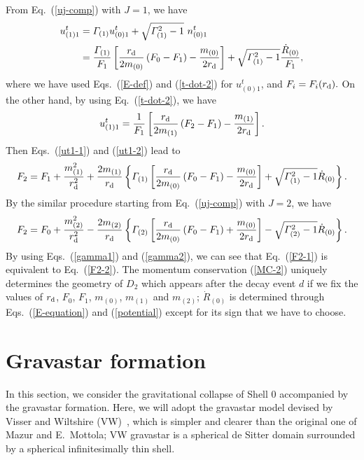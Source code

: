 \documentclass[aps,preprint,preprintnumber,nofootinbib,amsmath,amssymb,ascmac,bm,12pt]{revtex4}
\newcommand{\rd}{r_{\rm d}}
\newcommand{\mz}{m_{(0)}}
\newcommand{\mo}{m_{(1)}}
\newcommand{\mt}{m_{(2)}}
\newcommand{\Go}{\varGamma_{(1)}}
\newcommand{\Gt}{\varGamma_{(2)}}
\begin{document}
From Eq.~(\ref{uj-comp}) with $J=1$, we have
\begin{align}
u_{(1)1}^t&=\Go u_{(0)1}^t+\sqrt{\Go^2-1}~n_{(0)1}^t \nonumber \\
&=\frac{\Go}{F_1}\left[\frac{\rd}{2\mz}\left(F_0-F_1\right)-\frac{\mz}{2\rd}\right]+\sqrt{\Go^2-1}\frac{\dot{R}_{(0)}}{F_1}, 
\label{ut1-1}
\end{align}
where we have used Eqs.~(\ref{E-def}) and (\ref{t-dot-2}) for $u_{(0)1}^t$, and
$
F_i=F_i(\rd).
$
On the other hand, by using Eq.~(\ref{t-dot-2}), we have
\begin{equation}
u_{(1)1}^t=\frac{1}{F_1}\left[\frac{\rd}{2\mo}\left(F_2-F_1\right)-\frac{\mo}{2\rd}\right]. \label{ut1-2}
\end{equation}
Then Eqs.~(\ref{ut1-1}) and (\ref{ut1-2}) lead to
\begin{equation}
F_2=F_1+\frac{\mo^2}{\rd^2}+\frac{2\mo}{\rd}
\left\{\Go\left[\frac{\rd}{2\mz}\left(F_0-F_1\right)-\frac{\mz}{2\rd}\right]+\sqrt{\Go^2-1} \dot{R}_{(0)}\right\}. \label{F2-1}
\end{equation}
By the similar procedure starting from Eq.~(\ref{uj-comp}) with $J=2$, we have
\begin{equation}
F_2=F_0+\frac{\mt^2}{\rd^2}-\frac{2\mt}{\rd}
\left\{\Gt\left[\frac{\rd}{2\mz}\left(F_0-F_1\right)+\frac{\mz}{2\rd}\right]-\sqrt{\Gt^2-1} \dot{R}_{(0)}\right\}. \label{F2-2}
\end{equation}
By using Eqs.~(\ref{gamma1}) and (\ref{gamma2}), we can see that Eq.~(\ref{F2-1}) is equivalent to Eq.~(\ref{F2-2}). 
The momentum conservation (\ref{MC-2}) uniquely determines the geometry of $D_2$ which 
appears after the decay event $d$ if we fix the values of $\rd$, $F_0$, $F_1$, $\mz$, $\mo$ and $\mt$; 
$\dot{R}_{(0)}$ is determined through Eqs.~(\ref{E-equation}) and (\ref{potential}) except for its sign 
that we have to choose. 


\section{Gravastar formation}

In this section, we consider the gravitational collapse of Shell 0 accompanied by 
the gravastar formation. Here, we will adopt the gravastar model devised  
by Visser and Wiltshire (VW)~\cite{VW2004}, 
which is simpler and clearer than the original one of Mazur and E.~Mottola; VW gravastar is 
a spherical de Sitter domain surrounded by a spherical infinitesimally thin shell. 
\end{document}

